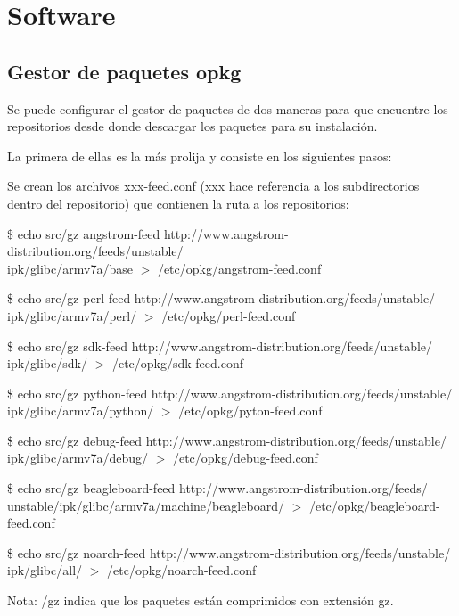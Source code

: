 \chapter{Software}\label{anx_sw}

\section{Gestor de paquetes opkg}\label{opkg}
Se puede configurar el gestor de paquetes de dos maneras para que encuentre los repositorios desde donde descargar los paquetes para su instalación. 

\bigskip
La primera de ellas es la más prolija y consiste en los siguientes pasos: 

\bigskip
Se crean los archivos xxx-feed.conf (xxx hace referencia a los subdirectorios dentro del repositorio) que contienen la ruta a los repositorios: 

\bigskip
\$ echo src/gz angstrom-feed http://www.angstrom-distribution.org/feeds/unstable/\\
ipk/glibc/armv7a/base  $>$ /etc/opkg/angstrom-feed.conf 

\$ echo src/gz perl-feed http://www.angstrom-distribution.org/feeds/unstable/\\
ipk/glibc/armv7a/perl/ $>$ /etc/opkg/perl-feed.conf 

\$ echo src/gz sdk-feed http://www.angstrom-distribution.org/feeds/unstable/\\
ipk/glibc/sdk/ $>$ /etc/opkg/sdk-feed.conf 

\$ echo src/gz python-feed http://www.angstrom-distribution.org/feeds/unstable/\\
ipk/glibc/armv7a/python/ $>$ /etc/opkg/pyton-feed.conf 

\$ echo src/gz debug-feed http://www.angstrom-distribution.org/feeds/unstable/\\
ipk/glibc/armv7a/debug/ $>$ /etc/opkg/debug-feed.conf 

\$ echo src/gz beagleboard-feed http://www.angstrom-distribution.org/feeds/\\
unstable/ipk/glibc/armv7a/machine/beagleboard/
$>$ /etc/opkg/beagleboard-feed.conf 

\$ echo src/gz noarch-feed http://www.angstrom-distribution.org/feeds/unstable/\\
ipk/glibc/all/ $>$ /etc/opkg/noarch-feed.conf 

\bigskip
Nota: /gz indica que los paquetes están comprimidos con extensión gz. 

